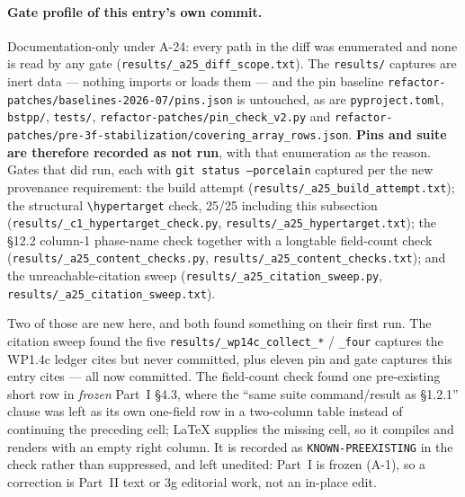 \documentclass[
  10pt,
]{article}
\begin{document}
\paragraph{Gate profile of this entry's own commit.}
Documentation-only under A-24: every path in the diff was enumerated and none is read by any gate (\texttt{results/\allowbreak{}\_a25\_diff\_scope.txt}). The \texttt{results/} captures are inert data --- nothing imports or loads them --- and the pin baseline \texttt{refactor-patches/\allowbreak{}baselines-2026-07/\allowbreak{}pins.json} is untouched, as are \texttt{pyproject.toml}, \texttt{bstpp/}, \texttt{tests/}, \texttt{refactor-patches/\allowbreak{}pin\_check\_v2.py} and \texttt{refactor-patches/\allowbreak{}pre-3f-stabilization/\allowbreak{}covering\_array\_rows.json}. \textbf{Pins and suite are therefore recorded as not run}, with that enumeration as the reason. Gates that did run, each with \texttt{git status --porcelain} captured per the new provenance requirement: the build attempt (\texttt{results/\allowbreak{}\_a25\_build\_attempt.txt}); the structural \texttt{\textbackslash hypertarget} check, 25/25 including this subsection (\texttt{results/\allowbreak{}\_c1\_hypertarget\_check.py}, \texttt{results/\allowbreak{}\_a25\_hypertarget.txt}); the §12.2 column-1 phase-name check together with a longtable field-count check (\texttt{results/\allowbreak{}\_a25\_content\_checks.py}, \texttt{results/\allowbreak{}\_a25\_content\_checks.txt}); and the unreachable-citation sweep (\texttt{results/\allowbreak{}\_a25\_citation\_sweep.py}, \texttt{results/\allowbreak{}\_a25\_citation\_sweep.txt}).

Two of those are new here, and both found something on their first run. The citation sweep found the five \texttt{results/\allowbreak{}\_wp14c\_collect\_*} / \texttt{\_four} captures the WP1.4c ledger cites but never committed, plus eleven pin and gate captures this entry cites --- all now committed. The field-count check found one pre-existing short row in \emph{frozen} Part~I §4.3, where the ``same suite command/result as §1.2.1'' clause was left as its own one-field row in a two-column table instead of continuing the preceding cell; \LaTeX{} supplies the missing cell, so it compiles and renders with an empty right column. It is recorded as \texttt{KNOWN-PREEXISTING} in the check rather than suppressed, and left unedited: Part~I is frozen (A-1), so a correction is Part~II text or 3g editorial work, not an in-place edit.
\end{document}
